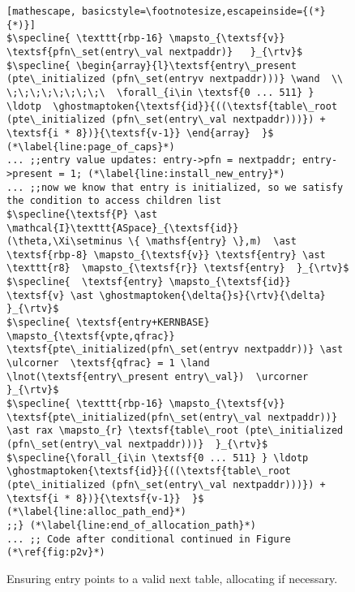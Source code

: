 \begin{figure}
\begin{lstlisting}[mathescape, basicstyle=\footnotesize,escapeinside={(*}{*)}]
$\specline{ \texttt{rbp-16} \mapsto_{\textsf{v}} \textsf{pfn\_set(entry\_val nextpaddr)}   }_{\rtv}$
$\specline{ \begin{array}{l}\textsf{entry\_present (pte\_initialized (pfn\_set(entryv nextpaddr)))} \wand  \\ \;\;\;\;\;\;\;\;\  \forall_{i\in \textsf{0 ... 511} } \ldotp  \ghostmaptoken{\textsf{id}}{((\textsf{table\_root (pte\_initialized (pfn\_set(entry\_val nextpaddr)))}) + \textsf{i * 8})}{\textsf{v-1}} \end{array}  }$ (*\label{line:page_of_caps}*)
... ;;entry value updates: entry->pfn = nextpaddr; entry->present = 1; (*\label{line:install_new_entry}*)
... ;;now we know that entry is initialized, so we satisfy the condition to access children list
$\specline{\textsf{P} \ast \mathcal{I}\texttt{ASpace}_{\textsf{id}}(\theta,\Xi\setminus \{ \mathsf{entry} \},m)  \ast \textsf{rbp-8} \mapsto_{\textsf{v}} \textsf{entry} \ast \texttt{r8}  \mapsto_{\textsf{r}} \textsf{entry}  }_{\rtv}$
$\specline{  \textsf{entry} \mapsto_{\textsf{id}} \textsf{v} \ast \ghostmaptoken{\delta{}s}{\rtv}{\delta} }_{\rtv}$
$\specline{ \textsf{entry+KERNBASE} \mapsto_{\textsf{vpte,qfrac}}  \textsf{pte\_initialized(pfn\_set(entryv nextpaddr))} \ast \ulcorner  \textsf{qfrac} = 1 \land \lnot(\textsf{entry\_present entry\_val})  \urcorner }_{\rtv}$
$\specline{ \texttt{rbp-16} \mapsto_{\textsf{v}} \textsf{pte\_initialized(pfn\_set(entry\_val nextpaddr))}  \ast rax \mapsto_{r} \textsf{table\_root (pte\_initialized (pfn\_set(entry\_val nextpaddr)))}  }_{\rtv}$
$\specline{\forall_{i\in \textsf{0 ... 511} } \ldotp  \ghostmaptoken{\textsf{id}}{((\textsf{table\_root (pte\_initialized (pfn\_set(entry\_val nextpaddr)))}) + \textsf{i * 8})}{\textsf{v-1}}  }$ (*\label{line:alloc_path_end}*)
;;} (*\label{line:end_of_allocation_path}*)
... ;; Code after conditional continued in Figure (*\ref{fig:p2v}*)
\end{lstlisting}
\fi
\vspace{-1em}
\caption{Ensuring \textsf{entry} points to a valid next table, allocating if necessary.}
\label{fig:calltopteinitialize}
\vspace{-1em}
\end{figure}

